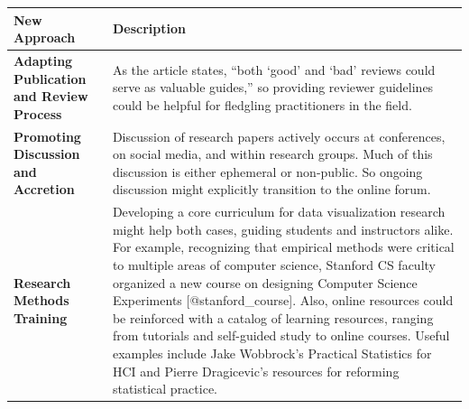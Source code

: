 \documentclass[]{book}
\theoremstyle{definition}
\theoremstyle{definition}
\theoremstyle{definition}
\theoremstyle{remark}
\begin{document}
\begin{longtable}[]{@{}ll@{}}
\toprule
\begin{minipage}[b]{0.16\columnwidth}\raggedright\strut
\textbf{New Approach}\strut
\end{minipage} & \begin{minipage}[b]{0.78\columnwidth}\raggedright\strut
\textbf{Description}\strut
\end{minipage}\tabularnewline
\midrule
\endhead
\begin{minipage}[t]{0.16\columnwidth}\raggedright\strut
\textbf{Adapting Publication and Review Process}\strut
\end{minipage} & \begin{minipage}[t]{0.78\columnwidth}\raggedright\strut
As the article states, ``both `good' and `bad' reviews could serve as
valuable guides,'' so providing reviewer guidelines could be helpful for
fledgling practitioners in the field.\strut
\end{minipage}\tabularnewline
\begin{minipage}[t]{0.16\columnwidth}\raggedright\strut
\textbf{Promoting Discussion and Accretion}\strut
\end{minipage} & \begin{minipage}[t]{0.78\columnwidth}\raggedright\strut
Discussion of research papers actively occurs at conferences, on social
media, and within research groups. Much of this discussion is either
ephemeral or non-public. So ongoing discussion might explicitly
transition to the online forum.\strut
\end{minipage}\tabularnewline
\begin{minipage}[t]{0.16\columnwidth}\raggedright\strut
\textbf{Research Methods Training}\strut
\end{minipage} & \begin{minipage}[t]{0.78\columnwidth}\raggedright\strut
Developing a core curriculum for data visualization research might help
both cases, guiding students and instructors alike. For example,
recognizing that empirical methods were critical to multiple areas of
computer science, Stanford CS faculty organized a new course on
designing Computer Science Experiments {[}@stanford\_course{]}. Also,
online resources could be reinforced with a catalog of learning
resources, ranging from tutorials and self-guided study to online
courses. Useful examples include Jake Wobbrock's Practical Statistics
for HCI and Pierre Dragicevic's resources for reforming statistical
practice.\strut
\end{minipage}\tabularnewline
\bottomrule
\end{longtable}
\end{document}
